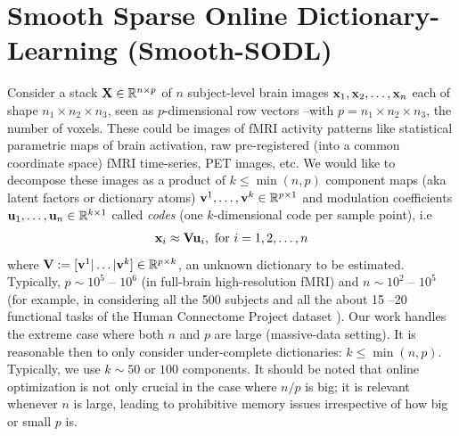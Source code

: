 \section{Smooth Sparse Online Dictionary-Learning (Smooth-SODL)}
\label{sec:contrib}
Consider a stack $\mathbf{X}
\in \mathbb R^{n \times p}$ of $n$ subject-level brain images
$\mathbf{x}_1,\mathbf{x}_2,\ldots,\mathbf{x}_n$ each of shape $n_1 \times n_2 \times n_3$, seen as
$p$-dimensional row vectors --with $p = n_1\times n_2 \times n_3$, the number of voxels. These could be images of fMRI activity
patterns like statistical parametric maps of brain activation, raw
pre-registered (into a common coordinate space) fMRI time-series, PET
images, etc. We would like to decompose these images as a product of
$k \le \min(n, p)$ component maps (aka latent factors or dictionary atoms)
 $\mathbf{v}^1,
\ldots, \mathbf{v}^k \in \mathbb{R}^{p \times 1}$ and modulation coefficients
$\mathbf{u}_1, \ldots, \mathbf{u}_n \in \mathbb R^{k \times 1}$ called \textit{codes} (one $k$-dimensional code per sample point), i.e
\begin{eqnarray}
\mathbf{x}_i \approx \mathbf{V} \mathbf{u}_i, \text{ for } i=1,2,\ldots,n
\end{eqnarray}
where $\mathbf{V} := [\mathbf{v}^1|\ldots|\mathbf{v}^k] \in \mathbb{R}^{p \times k}$, an unknown dictionary to be estimated.
Typically, $p \sim 10^{5}$ --
$10^{6}$ (in full-brain high-resolution fMRI) and $n \sim 10^{2}$ --
$10^{5}$ (for example, in considering all the 500 subjects and all
the about 15 --20 functional tasks of the Human Connectome Project dataset  \cite{VanEssen20122222}). Our work handles the extreme
case where both $n$ and $p$ are large (massive-data setting). 
%
It is reasonable then to only consider under-complete dictionaries: $k
\le \min(n, p)$. Typically, we use $k \sim 50$ or $100$ components.
%
It should be noted that online optimization is not only crucial in the
case where $n / p$ is big; it is relevant whenever $n$ is large,
leading to prohibitive memory issues irrespective of how big or small
$p$ is.


